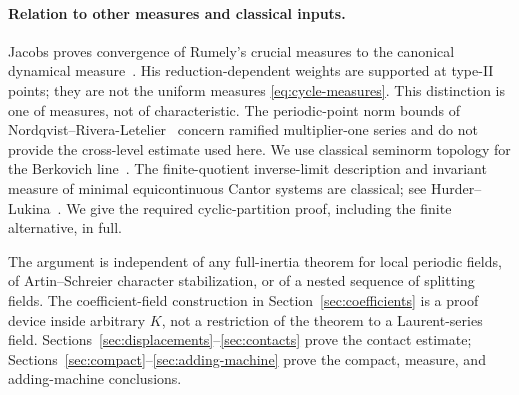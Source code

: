 \paragraph{Relation to other measures and classical inputs.}
Jacobs proves convergence of Rumely's crucial measures to the
canonical dynamical measure~\cite[Theorem 2]{jacobs2017crucial}.
His reduction-dependent weights are supported at type-II points;
they are not the uniform measures \eqref{eq:cycle-measures}.
This distinction is one of measures, not of characteristic.
The periodic-point norm bounds of
Nordqvist--Rivera-Letelier~\cite[Theorem 3]{nordqvist2020residue}
concern ramified multiplier-one series and do not provide the
cross-level estimate used here. We use classical seminorm topology
for the Berkovich line~\cite{baker2007berkovich}. The finite-quotient
inverse-limit description and invariant measure of minimal equicontinuous
Cantor systems are classical; see
Hurder--Lukina~\cite[author version, Sections 2.2--2.3]{hurder2025essential}.
We give the required cyclic-partition proof, including the finite
alternative, in full.

The argument is independent of any full-inertia theorem for local
periodic fields, of Artin--Schreier character stabilization, or of a
nested sequence of splitting fields. The coefficient-field construction
in Section~\ref{sec:coefficients} is a proof device inside arbitrary
$K$, not a restriction of the theorem to a Laurent-series field.
Sections~\ref{sec:displacements}--\ref{sec:contacts} prove the contact
estimate; Sections~\ref{sec:compact}--\ref{sec:adding-machine} prove
the compact, measure, and adding-machine conclusions.
